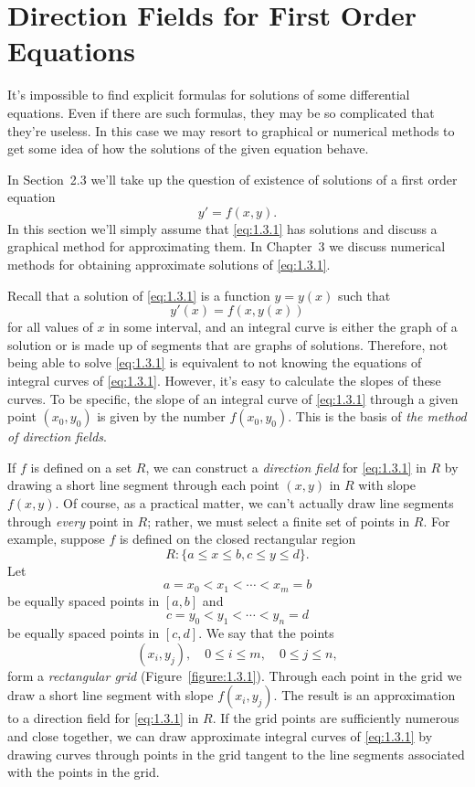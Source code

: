 \section{Direction Fields for First Order Equations}

\noindent
It's impossible to find explicit formulas for solutions of some differential equations. Even if
there are such formulas, they may be so complicated that they're useless. In this case we may resort
to graphical or numerical methods to get some idea of how the solutions of the given equation
behave.

In Section~2.3 we'll take up the question of existence of solutions of a first order equation
\begin{equation}
  \label{eq:1.3.1}y'=f(x,y).
\end{equation}
In this section we'll simply assume that \eqref{eq:1.3.1} has solutions and discuss a graphical
method for approximating them. In Chapter~3 we discuss numerical methods for obtaining approximate
solutions of \eqref{eq:1.3.1}.

Recall that a solution of \eqref{eq:1.3.1} is a function $y=y(x)$ such that
\[
  y'(x)=f(x,y(x))
\]
for all values of $x$ in some interval, and an integral curve is either the graph of a solution or
is made up of segments that are graphs of solutions. Therefore, not being able to solve
\eqref{eq:1.3.1} is equivalent to not knowing the equations of integral curves of \eqref{eq:1.3.1}.
However, it's easy to calculate the slopes of these curves. To be specific, the slope of an integral
curve of \eqref{eq:1.3.1} through a given point $(x_{0},y_{0})$ is given by the number
$f(x_{0},y_{0})$. This is the basis of {\color{blue}\it the method of direction fields\/}.

If $f$ is defined on a set $R$, we can construct a {\color{blue}\it direction field \/} for
\eqref{eq:1.3.1} in $R$ by drawing a short line segment through each point $(x,y)$ in $R$ with slope
$f(x,y)$. Of course, as a practical matter, we can't actually draw line segments through
{\color{blue}\it every\/} point in $R$; rather, we must select a finite set of points in $R$. For
example, suppose $f$ is defined on the closed rectangular region
\[
  R:\{a\le x\le b,c\le y\le d\}.
\]
Let
\[
  a=x_{0}<x_{1}<\cdots<x_{m}=b
\]
be equally spaced points in $[a,b]$ and
\[
  c=y_{0}<y_{1}<\cdots<y_{n}=d
\]
be equally spaced points in $[c,d]$. We say that the points
\[
  (x_{i},y_{j}),\quad0\le i\le m,\quad0\le j\le n,
\]
form a {\color{blue}\it rectangular grid\/} (Figure~\ref{figure:1.3.1}). Through each point in the
grid we draw a short line segment with slope $f(x_{i},y_{j})$. The result is an approximation to a
direction field for \eqref{eq:1.3.1} in $R$. If the grid points are sufficiently numerous and close
together, we can draw approximate integral curves of \eqref{eq:1.3.1} by drawing curves through
points in the grid tangent to the line segments associated with the points in the grid.

